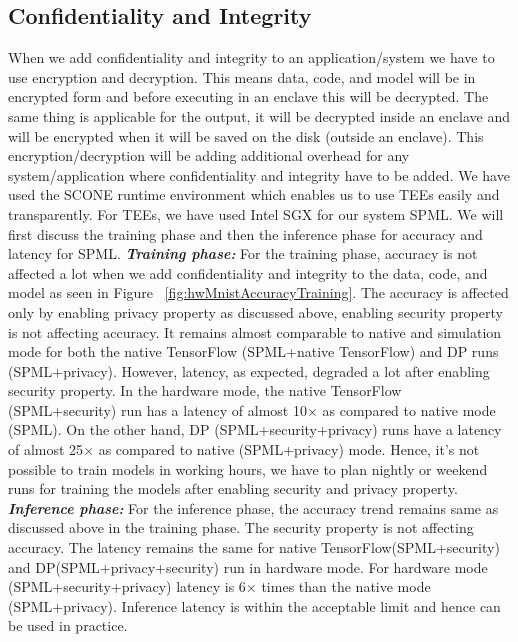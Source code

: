 \subsection{Confidentiality and Integrity}
When we add confidentiality and integrity to an application/system we have to use encryption and decryption. This means data, code, and model will be in encrypted form and before executing in an enclave this will be decrypted. The same thing is applicable for the output, it will be decrypted inside an enclave and will be encrypted when it will be saved on the disk (outside an enclave). This encryption/decryption will be adding additional overhead for any system/application where confidentiality and integrity have to be added. We have used the SCONE runtime environment which enables us to use TEEs easily and transparently. For TEEs, we have used Intel SGX for our system SPML. We will first discuss the training phase and then the inference phase for accuracy and latency for SPML.
\newline
\newline
\textbf{\textit{Training phase: }}For the training phase, accuracy is not affected a lot when we add confidentiality and integrity to the data, code, and model as seen in Figure ~\ref{fig:hwMnistAccuracyTraining}. The accuracy is affected only by enabling privacy property as discussed above, enabling security property is not affecting accuracy. It remains almost comparable to native and simulation mode for both the native TensorFlow (SPML+native TensorFlow) and DP runs (SPML+privacy). However, latency, as expected, degraded a lot after enabling security property. In the hardware mode, the native TensorFlow (SPML+security) run has a latency of almost 10$\times$ as compared to native mode (SPML). On the other hand, DP (SPML+security+privacy) runs have a latency of almost 25$\times$ as compared to native (SPML+privacy) mode. Hence, it's not possible to train models in working hours, we have to plan nightly or weekend runs for training the models after enabling security and privacy property.
\newline
\newline
\textbf{\textit{Inference phase: }}For the inference phase, the accuracy trend remains same as discussed above in the training phase. The security property is not affecting accuracy. The latency remains the same for native TensorFlow(SPML+security) and DP(SPML+privacy+security) run in hardware mode. For hardware mode (SPML+security+privacy) latency is 6$\times$ times  than the native mode (SPML+privacy). Inference latency is within the acceptable limit and hence can be used in practice. 

